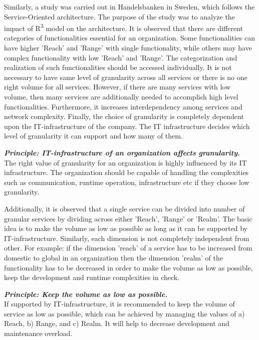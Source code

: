 Similarly, a study was carried out in Handelsbanken in Sweden, which follows the Service-Oriented architecture. The purpose of the study was to analyze the impact of R\textsuperscript{3} model on the architecture. It is observed that there are different categories of functionalities essential for an organization. Some functionalities can have higher 'Reach' and 'Range' with single functionality, while others may have complex functionality with low 'Reach' and 'Range'. The categorization and realization of such functionalities should be accessed individually. It is not necessary to have same level of granularity across all services or there is no one right volume for all services. However, if there are many services with low volume, then many services are additionally needed to accomplish high level functionalities. Furthermore, it increases interdependency among services and network complexity. Finally, the choice of granularity is completely dependent upon the IT-infrastructure of the company. The IT infrastructure decides which level of granularity it can support and how many of them. \cite{Pierre-Reldin:2007aa}


\begin{framed}
\textbf{\textit{Principle: IT-infrastructure of an organization affects granularity.}} \label{principle:granularity/IT_infrastructure}
\\
The right value of granularity for an organization is highly influenced by its IT infrastructure. The organization should be capable of handling the complexities such as communication, runtime operation, infrastructure etc if they choose low granularity. \cite{Pierre-Reldin:2007aa}
\end{framed}

Additionally, it is observed that a single service can be divided into number of granular services by dividing across either 'Reach', 'Range' or 'Realm'. The basic idea is to make the volume as low as possible as long as it can be supported by IT-infrastructure. Similarly, each dimension is not completely independent from other. For example: if the dimension 'reach' of a service has to be increased from domestic to global in an organization then the dimension 'realm' of the functionality has to be decreased in order to make the volume as low as possible, keep the development and runtime complexities in check. \cite{Pierre-Reldin:2007aa}

\begin{framed}
\textbf{\textit{Principle: Keep the volume as low as possible.}}
\\
If supported by IT-infrastructure, it is recommended to keep the volume of service as low as possible, which can be achieved by managing the values of a) Reach, b) Range, and c) Realm. It will help to decrease development and maintenance overload. \cite{Pierre-Reldin:2007aa}
\end{framed}

